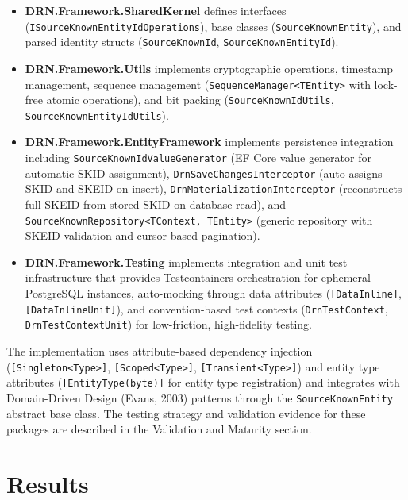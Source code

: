 \documentclass[fleqn,10pt,lineno]{wlpeerj}
\providecommand{\tightlist}{%
  \setlength{\itemsep}{0pt}\setlength{\parskip}{0pt}}
\begin{document}
\begin{itemize}
\tightlist
\item
  \textbf{DRN.Framework.SharedKernel} defines interfaces
  (\texttt{ISourceKnownEntityIdOperations}), base classes
  (\texttt{SourceKnownEntity}), and parsed identity structs
  (\texttt{SourceKnownId}, \texttt{SourceKnownEntityId}).
\item
  \textbf{DRN.Framework.Utils} implements cryptographic operations,
  timestamp management, sequence management
  (\texttt{SequenceManager\textless{}TEntity\textgreater{}} with
  lock-free atomic operations), and bit packing
  (\texttt{SourceKnownIdUtils}, \texttt{SourceKnownEntityIdUtils}).
\item
  \textbf{DRN.Framework.EntityFramework} implements persistence
  integration including \texttt{SourceKnownIdValueGenerator} (EF Core
  value generator for automatic SKID assignment),
  \texttt{DrnSaveChangesInterceptor} (auto-assigns SKID and SKEID on
  insert), \texttt{DrnMaterializationInterceptor} (reconstructs full
  SKEID from stored SKID on database read), and
  \texttt{SourceKnownRepository\textless{}TContext,\ TEntity\textgreater{}}
  (generic repository with SKEID validation and cursor-based
  pagination).
\item
  \textbf{DRN.Framework.Testing} implements integration and unit test
  infrastructure that provides Testcontainers orchestration for
  ephemeral PostgreSQL instances, auto-mocking through data attributes
  (\texttt{{[}DataInline{]}}, \texttt{{[}DataInlineUnit{]}}), and
  convention-based test contexts (\texttt{DrnTestContext},
  \texttt{DrnTestContextUnit}) for low-friction, high-fidelity testing.
\end{itemize}

The implementation uses attribute-based dependency injection
(\texttt{{[}Singleton\textless{}Type\textgreater{}{]}},
\texttt{{[}Scoped\textless{}Type\textgreater{}{]}},
\texttt{{[}Transient\textless{}Type\textgreater{}{]}}) and entity type
attributes (\texttt{{[}EntityType(byte){]}} for entity type
registration) and integrates with Domain-Driven Design (Evans, 2003)
patterns through the \texttt{SourceKnownEntity} abstract base class. The
testing strategy and validation evidence for these packages are
described in the Validation and Maturity section.

\section{Results}\label{results}
\end{document}
